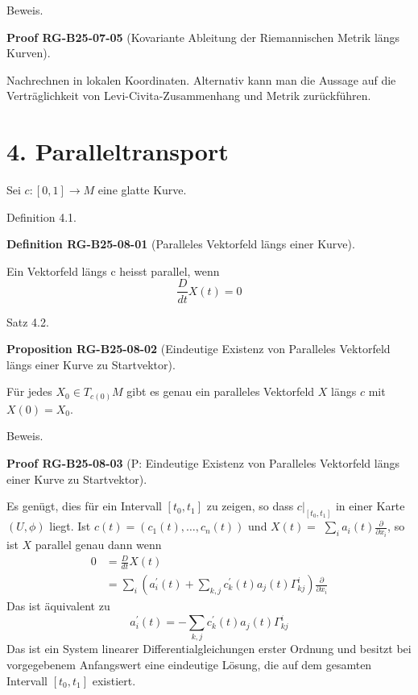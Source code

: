 \documentclass[10pt, letterpaper]{article}
\newcommand{\CustomHeading}[3]{%
  \par\medskip\noindent%
  \textbf{#1 #2} \textnormal{(#3)}.\enskip%
}
\newenvironment{DEF}[2]{\begin{unitbox}\CustomHeading{Definition}{#1}{#2}}{\end{unitbox}}
\newenvironment{PROP}[2]{\begin{unitbox}\CustomHeading{Proposition}{#1}{#2}}{\end{unitbox}}
\newenvironment{PROOF}[2]{\begin{unitbox}\CustomHeading{Proof}{#1}{#2}}{\end{unitbox}}
\begin{document}
Beweis. 

\begin{PROOF}{RG-B25-07-05}{Kovariante Ableitung der Riemannischen Metrik längs Kurven}
Nachrechnen in lokalen Koordinaten. Alternativ kann man die Aussage auf die Verträglichkeit von Levi-Civita-Zusammenhang 
und Metrik zurückführen.
\end{PROOF}

\section*{4. Paralleltransport}


Sei $c:[0,1] \rightarrow M$ eine glatte Kurve.


Definition 4.1. 


\begin{DEF}{RG-B25-08-01}{Paralleles Vektorfeld längs einer Kurve}
Ein Vektorfeld längs c heisst parallel, wenn
$$
\frac{D}{d t} X(t)=0
$$
\end{DEF}


Satz 4.2. 


\begin{PROP}{RG-B25-08-02}{Eindeutige Existenz von Paralleles Vektorfeld längs einer Kurve zu Startvektor}
Für jedes $X_{0} \in T_{c(0)} M$ gibt es genau ein paralleles Vektorfeld $X$ längs $c$ mit $X(0)=X_{0}$.
\end{PROP}

Beweis. 


\begin{PROOF}{RG-B25-08-03}{P: Eindeutige Existenz von Paralleles Vektorfeld längs einer Kurve zu Startvektor}
Es genügt, dies für ein Intervall $\left[t_{0}, t_{1}\right]$ zu zeigen, so dass $\left.c\right|_{\left[t_{0}, t_{1}\right]}$ in einer Karte $(U, \phi)$ liegt. Ist $c(t)=\left(c_{1}(t), \ldots, c_{n}(t)\right)$ und $X(t)=$ $\sum_{i} a_{i}(t) \frac{\partial}{\partial x_{i}}$, so ist $X$ parallel genau dann wenn
$$
\begin{aligned}
0 & =\frac{D}{d t} X(t) \\
& =\sum_{i}\left(a_{i}^{\prime}(t)+\sum_{k, j} c_{k}^{\prime}(t) a_{j}(t) \Gamma_{k j}^{i}\right) \frac{\partial}{\partial x_{i}}
\end{aligned}
$$
Das ist äquivalent zu
$$
a_{i}^{\prime}(t)=-\sum_{k, j} c_{k}^{\prime}(t) a_{j}(t) \Gamma_{k j}^{i}
$$
Das ist ein System linearer Differentialgleichungen erster Ordnung und besitzt bei vorgegebenem Anfangswert eine eindeutige Lösung, die auf dem gesamten Intervall $\left[t_{0}, t_{1}\right]$ existiert.
\end{PROOF}
\end{document}

